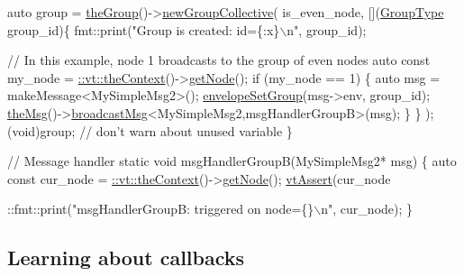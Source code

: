 \begin{DoxyCodeInclude}
  \textcolor{keyword}{auto} group = \hyperlink{namespacevt_a4548473dce44fb654400009e2b2fe64e}{theGroup}()->\hyperlink{structvt_1_1group_1_1_group_manager_a92b301d6cf77af7d57ed822c6f044d58}{newGroupCollective}(
    is\_even\_node, [](\hyperlink{namespacevt_a27b5e4411c9b6140c49100e050e2f743}{GroupType} group\_id)\{
      fmt::print(\textcolor{stringliteral}{"Group is created: id=\{:x\}\(\backslash\)n"}, group\_id);

      \textcolor{comment}{// In this example, node 1 broadcasts to the group of even nodes}
      \textcolor{keyword}{auto} \textcolor{keyword}{const} my\_node = \hyperlink{namespacevt_a26551fe0e6e6a1371111df5b12c7e92c}{::vt::theContext}()->\hyperlink{structvt_1_1ctx_1_1_context_a0d52c263ce8516546a67443d9a86fa5f}{getNode}();
      \textcolor{keywordflow}{if} (my\_node == 1) \{
        \textcolor{keyword}{auto} msg = makeMessage<MySimpleMsg2>();
        \hyperlink{namespacevt_a9f9d4ce6034c0eaaf98bdffd33d0e1c7}{envelopeSetGroup}(msg->env, group\_id);
        \hyperlink{namespacevt_aeafd31f866aeb4dc6fc2f6ee97136350}{theMsg}()->\hyperlink{group__typesafehan_ga1a347aac6b6b8d47c9b1c8cc11b7f33e}{broadcastMsg}<MySimpleMsg2,msgHandlerGroupB>(msg);
      \}
    \}
  );
  (void)group;  \textcolor{comment}{// don't warn about unused variable}
\}

\textcolor{comment}{// Message handler}
\textcolor{keyword}{static} \textcolor{keywordtype}{void} msgHandlerGroupB(MySimpleMsg2* msg) \{
  \textcolor{keyword}{auto} \textcolor{keyword}{const} cur\_node = \hyperlink{namespacevt_a26551fe0e6e6a1371111df5b12c7e92c}{::vt::theContext}()->\hyperlink{structvt_1_1ctx_1_1_context_a0d52c263ce8516546a67443d9a86fa5f}{getNode}();
  \hyperlink{config__assert_8h_aeddd4990a496e91a0ca5d6c16437359b}{vtAssert}(cur\_node %

  ::fmt::print(\textcolor{stringliteral}{"msgHandlerGroupB: triggered on node=\{\}\(\backslash\)n"}, cur\_node);
\}
\end{DoxyCodeInclude}
\hypertarget{tutorial-1g}{}\subsection{Learning about callbacks}\label{tutorial-1g}

